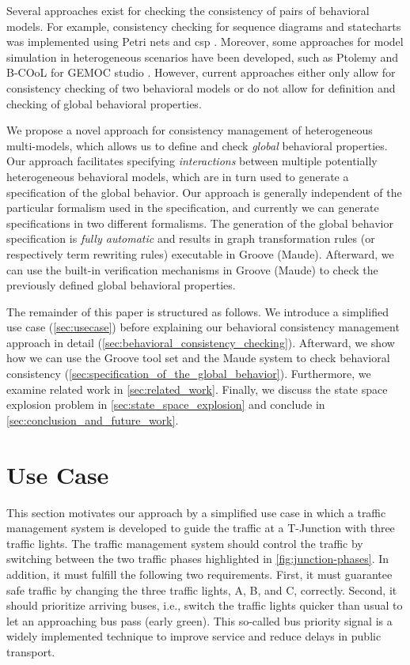\documentclass{jot}
\begin{document}
Several approaches exist for checking the consistency of pairs of behavioral models.
For example, consistency checking for sequence diagrams and statecharts was implemented using Petri nets \cite{yaoConsistencyCheckingUML2006} and \gls*{csp} \cite{kusterExplicitBehavioralConsistency2003}.
Moreover, some approaches for model simulation in heterogeneous scenarios have been developed, such as Ptolemy \cite{ekerTamingHeterogeneityPtolemy2003} and B-COoL for GEMOC studio \cite{varalarsenBehavioralCoordinationOperator2015}.
However, current approaches either only allow for consistency checking of two behavioral models or do not allow for definition and checking of global behavioral properties.

We propose a novel approach for consistency management of heterogeneous multi-models, which allows us to define and check \emph{global} behavioral properties.
Our approach facilitates specifying \emph{interactions} between multiple potentially heterogeneous behavioral models, which are in turn used to generate a specification of the global behavior.
Our approach is generally independent of the particular formalism used in the specification, and currently we can generate specifications in two different formalisms.
The generation of the global behavior specification is \emph{fully automatic} and results in graph transformation rules (or respectively term rewriting rules) executable in Groove (Maude).
Afterward, we can use the built-in verification mechanisms in Groove (Maude) to check the previously defined global behavioral properties.

The remainder of this paper is structured as follows.
We introduce a simplified use case (\autoref{sec:usecase}) before explaining our behavioral consistency management approach in detail (\autoref{sec:behavioral_consistency_checking}).
Afterward, we show how we can use the Groove tool set and the Maude system to check behavioral consistency (\autoref{sec:specification_of_the_global_behavior}).
Furthermore, we examine related work in \autoref{sec:related_work}.
Finally, we discuss the state space explosion problem in \autoref{sec:state_space_explosion} and conclude in \autoref{sec:conclusion_and_future_work}.


\section{Use Case} \label{sec:usecase}
This section motivates our approach by a simplified use case in which a traffic management system is developed to guide the traffic at a T-Junction with three traffic lights.
The traffic management system should control the traffic by switching between the two traffic phases highlighted in \cref{fig:junction-phases}.
In addition, it must fulfill the following two requirements.
First, it must guarantee safe traffic by changing the three traffic lights, A, B, and C, correctly.
Second, it should prioritize arriving buses, i.e., switch the traffic lights quicker than usual to let an approaching bus pass (early green).
This so-called bus priority signal is a widely implemented technique to improve service and reduce delays in public transport.
\end{document}
